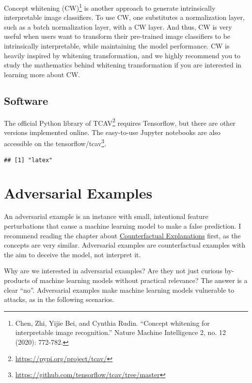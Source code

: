 \documentclass[
  11pt,
]{scrbook}
\renewcommand{\href}[2]{#2\footnote{\url{#1}}}
\begin{document}
Concept whitening (CW)\footnote{Chen, Zhi, Yijie Bei, and Cynthia Rudin. ``Concept whitening for interpretable image recognition.'' Nature Machine Intelligence 2, no. 12 (2020): 772-782.} is another approach to generate intrinsically interpretable image classifiers.
To use CW, one substitutes a normalization layer, such as a batch normalization layer, with a CW layer.
And thus, CW is very useful when users want to transform their pre-trained image classifiers to be intrinsically interpretable, while maintaining the model performance.
CW is heavily inspired by whitening transformation, and we highly recommend you to study the mathematics behind whitening transformation if you are interested in learning more about CW.

\hypertarget{software-7}{%
\subsection{Software}\label{software-7}}

The official Python library of \href{https://pypi.org/project/tcav/}{TCAV} requires Tensorflow, but there are other versions implemented online.
The easy-to-use Jupyter notebooks are also accessible on the \href{https://github.com/tensorflow/tcav/tree/master}{tensorflow/tcav}.

\begin{verbatim}
## [1] "latex"
\end{verbatim}

\newpage

\hypertarget{adversarial}{%
\section{Adversarial Examples}\label{adversarial}}

An adversarial example is an instance with small, intentional feature perturbations that cause a machine learning model to make a false prediction.
I recommend reading the chapter about \protect\hyperlink{counterfactual}{Counterfactual Explanations} first, as the concepts are very similar.
Adversarial examples are counterfactual examples with the aim to deceive the model, not interpret it.

Why are we interested in adversarial examples?
Are they not just curious by-products of machine learning models without practical relevance?
The answer is a clear ``no''.
Adversarial examples make machine learning models vulnerable to attacks, as in the following scenarios.
\end{document}
